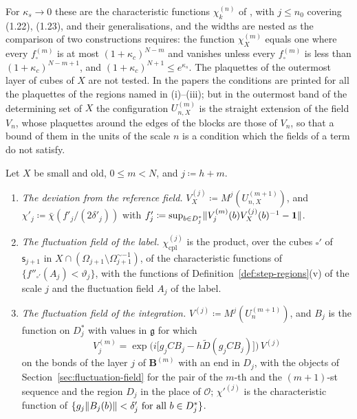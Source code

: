 \documentclass[11pt]{preprint}
\newcommand{\id}{\mathbf 1}
\DeclarePairedDelimiter{\norm}{\lVert}{\rVert}
\numberwithin{equation}{section}
\begin{document}
For $\kappa_s \to 0$ these are the characteristic functions $\chi^{(n)}_k$ of \cite[(1.22)--(1.24)]{BalabanLFR1}, with $j \leqslant n_0$ covering (1.22), (1.23), and their generalisations, and the widths are nested as the comparison of two constructions requires: the function $\chi^{(m)}_X$ equals one where every $f^{(m)}_\square$ is at most $(1 + \kappa_c)^{N-m}$ and vanishes unless every $f^{(m)}_\square$ is less than $(1 + \kappa_c)^{N-m+1}$, and $(1 + \kappa_c)^{N+1} \leqslant e^{\kappa_s}$. The plaquettes of the outermost layer of cubes of $X$ are not tested. In the papers the conditions are printed for all the plaquettes of the regions named in (i)--(iii); but in the outermost band of the determining set of $X$ the configuration $U^{(m)}_{n,X}$ is the straight extension of the field $V_n$, whose plaquettes around the edges of the blocks are those of $V_n$, so that a bound of them in the units of the scale $n$ is a condition which the fields of a term do not satisfy.

\begin{definition}\label{def:preparatory-tests}
Let $X$ be small and old, $0 \leqslant m < N$, and $j \coloneqq h + m$.
\begin{enumerate}[label=(\roman*)]
\item \emph{The deviation from the reference field.} $V^{(j)}_X \coloneqq M^j(U^{(m+1)}_{n,X})$, and $\chi'_j \coloneqq \bar\chi(f'_j/(2\delta'_j))$ with $f'_j \coloneqq \sup_{b \in D^*_j}\norm{V^{(m)}_j(b)V^{(j)}_X(b)^{-1} - \id}$.
\item \emph{The fluctuation field of the label.} $\chi^{(j)}_{\mathrm{cpl}}$ is the product, over the cubes $\square'$ of $\mathsf s_{j+1}$ in $X \cap (\Omega_{j+1} \setminus \Omega^{\sim-1}_{j+1})$, of the characteristic functions of $\{ f''_{\square'}(A_j) < \vartheta_j \}$, with the functions of Definition~\ref{def:step-regions}(v) of the scale $j$ and the fluctuation field $A_j$ of the label.
\item \emph{The fluctuation field of the integration.} $V^{(j)} \coloneqq M^j(U^{(m+1)}_n)$, and $B_j$ is the function on $D^*_j$ with values in $\mathfrak g$ for which
\begin{equation}\label{eq:preparatory-field}
    V^{(m)}_j = \exp\bigl(i\bigl[g_jCB_j - h\tilde D(g_jCB_j)\bigr]\bigr)\,V^{(j)}
\end{equation}
on the bonds of the layer $j$ of $\mathbf B^{(m)}$ with an end in $D_j$, with the objects of Section~\ref{sec:fluctuation-field} for the pair of the $m$-th and the $(m + 1)$-st sequence and the region $D_j$ in the place of $\mathcal O$; $\chi'^{(j)}$ is the characteristic function of $\{ g_j\norm{B_j(b)} < \delta'_j \text{ for all } b \in D^*_j \}$.
\end{enumerate}
\end{definition}
\end{document}
